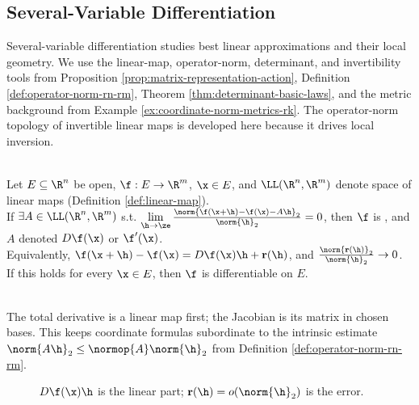 \subsection{Several-Variable Differentiation}

%

Several-variable differentiation studies best linear approximations and their local geometry. We use the linear-map, operator-norm, determinant, and invertibility tools from Proposition \ref{prop:matrix-representation-action}, Definition \ref{def:operator-norm-rn-rm}, Theorem \ref{thm:determinant-basic-laws}, and the metric background from Example \ref{ex:coordinate-norm-metrics-rk}. The operator-norm topology of invertible linear maps is developed here because it drives local inversion.

\begin{definition} \label{def:several-variable-differentiation-core-source-todo}\label{def:total-derivative-rn-rm} \\
Let $E\subseteq\R^n$ be open, $\f:E\to\R^m$, $\x\in E$, and $\LL(\R^n,\R^m)$ denote space of linear maps (Definition \ref{def:linear-map}).\\
If $\exists A\in\LL(\R^n,\R^m)$ s.t. $\lim\limits_{\h\to\ze}\frac{\norm{\f(\x+\h)-\f(\x)-A\h}_2}{\norm{\h}_2}=0$, then $\f$ is , and $A$ denoted $D\f(\x)$ or $\f'(\x)$.\\
Equivalently, $\f(\x+\h)-\f(\x)=D\f(\x)\h+\mathbf{r}(\h)$, and $\frac{\norm{\mathbf{r}(\h)}_2}{\norm{\h}_2}\to0$.\\
If this holds for every $\x\in E$, then $\f$ is differentiable on $E$.
\end{definition}

\begin{perspective} \label{per:total-derivative-linear-map-first} \\
The total derivative is a linear map first; the Jacobian is its matrix in chosen bases. This keeps coordinate formulas subordinate to the intrinsic estimate $\norm{A\h}_2\leq\normop{A}\norm{\h}_2$ from Definition \ref{def:operator-norm-rn-rm}.
\end{perspective}

\begin{figure}[H]
  \centering
  
  \caption{$D\f(\x)\h$ is the linear part; $\mathbf{r}(\h)=o(\norm{\h}_2)$ is the error.}
  \label{fig:total-derivative-linear-approximation}
\end{figure}

